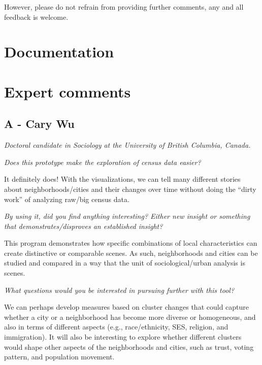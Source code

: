 \documentclass[a4paper]{article}
\newcommand{\question}[1]{\smallskip\noindent\emph{#1}}
\begin{document}
However, please do not refrain from providing further comments, any and all
feedback is welcome. 


\section{Documentation}



\section{Expert comments}
\subsection{A - Cary Wu}
\emph{Doctoral candidate in Sociology at the University of British Columbia, Canada.}

\question{Does this prototype make the exploration of census data easier?}
 

It definitely does! With the visualizations, we can tell many different stories
about neighborhoods/cities and their changes over time without doing the “dirty
work” of analyzing raw/big census data.
 

 

\question{By using it, did you find anything interesting? Either new insight or
something that demonstrates/disproves an established insight? }
 

This program demonstrates how specific combinations of local characteristics can
create distinctive or comparable scenes. As such, neighborhoods and cities can
be studied and compared in a way that the unit of sociological/urban analysis is
scenes.
 
 
\question{What questions would you be interested in pursuing further with this tool?}
 

We can perhaps develop measures based on cluster changes that could capture
whether a city or a neighborhood has become more diverse or homogeneous, and
also in terms of different aspects (e.g., race/ethnicity, SES, religion, and
immigration). It will also be interesting to explore whether different clusters
would shape other aspects of the neighborhoods and cities, such as trust, voting
pattern, and population movement.
 
\end{document}
